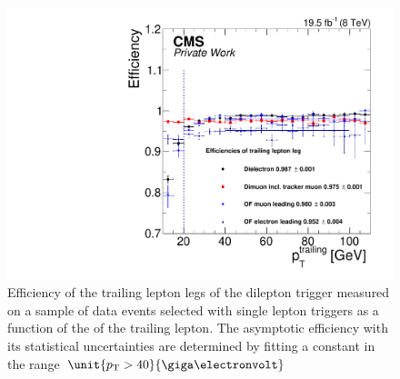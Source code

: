 \begin{figure}
\begin{center}
\includegraphics[scale=0.35]{plots/BG/trigger/Triggereff_SingleLepton_HighHTExclusive_Full2012_TrailingPt_leadingPt30Single.pdf}
\caption{Efficiency of the trailing lepton legs of the dilepton trigger measured on a sample of data events selected with single lepton triggers as a function of the \pt of the trailing lepton. The asymptotic efficiency with its statistical uncertainties are determined by fitting a constant in the range $\unit{\pt > 40}{\giga\electronvolt}$}
\label{fig:triggerEffTrailing}
\end{center}
\end{figure} 

